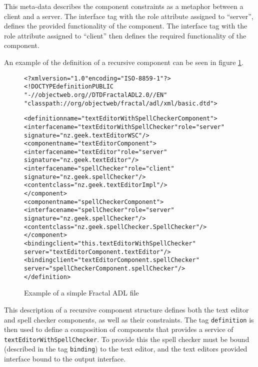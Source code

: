 This meta-data describes the component constraints as a metaphor between a client and a server.
The interface tag with the role attribute assigned to ``server'', defines the provided functionality of the component.
The interface tag with the role attribute assigned to ``client'' then defines the required functionality of the component.  

An example of the definition of a recursive component can be seen in figure \ref{fractalrecursve}.

\begin{figure}[htp]
\begin{center}
\begin{alltt}
<?xml version="1.0" encoding="ISO-8859-1" ?>
<!DOCTYPE definition PUBLIC 
    "-//objectweb.org//DTD Fractal ADL 2.0//EN" 
    "classpath://org/objectweb/fractal/adl/xml/basic.dtd">

<definition name="textEditorWithSpellCheckerComponent">
  <interface name="textEditorWithSpellChecker" role="server" 
   signature="nz.geek.textEditorWSC"/>
  <component name="textEditorComponent">
    <interface name="textEditor" role="server" 
     signature="nz.geek.textEditor"/>
    <interface name="spellChecker" role="client" 
     signature="nz.geek.spellChecker"/>
    <content class="nz.geek.textEditorImpl"/>
  </component>
  <component name="spellCheckerComponent">
    <interface name="spellChecker" role="server" 
     signature="nz.geek.spellChecker"/>
    <content class="nz.geek.spellChecker.SpellChecker"/>
  </component>
  <binding client="this.textEditorWithSpellChecker" 
   server="textEditorComponent.textEditor"/>
  <binding client="textEditorComponent.spellChecker" 
   server="spellCheckerComponent.spellChecker"/>
</definition>
\end{alltt}
  \caption[Fractal ADL Example]{Example of a simple Fractal ADL file}
  \label{fractalrecursve}
\end{center}
\end{figure}

This description of a recursive component structure defines both the text editor and spell checker components, as well as their constraints.
The tag \texttt{definition} is then used to define a composition of components that provides a service of \texttt{textEditorWithSpellChecker}.
To provide this the spell checker must be bound (described in the tag \texttt{binding}) to the text editor,
and the text editors provided interface bound to the output interface. 

